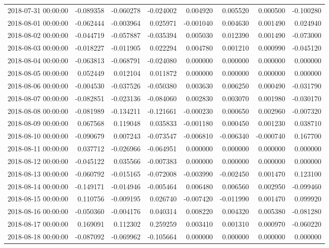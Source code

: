 \begin{tabular}{lrrrrrrr}
2018-07-31 00:00:00 & -0.089358 & -0.060278 & -0.024002 & 0.004920 & 0.005520 & 0.000500 & -0.100280 \\
2018-08-01 00:00:00 & -0.062444 & -0.003964 & 0.025971 & -0.001040 & 0.004630 & 0.001490 & 0.024940 \\
2018-08-02 00:00:00 & -0.044719 & -0.057887 & -0.035394 & 0.005030 & 0.012390 & 0.001490 & -0.073000 \\
2018-08-03 00:00:00 & -0.018227 & -0.011905 & 0.022294 & 0.004780 & 0.001210 & 0.000990 & -0.045120 \\
2018-08-04 00:00:00 & -0.063813 & -0.068791 & -0.024080 & 0.000000 & 0.000000 & 0.000000 & 0.000000 \\
2018-08-05 00:00:00 & 0.052449 & 0.012104 & 0.011872 & 0.000000 & 0.000000 & 0.000000 & 0.000000 \\
2018-08-06 00:00:00 & -0.004530 & -0.037526 & -0.050380 & 0.003630 & 0.006250 & 0.000490 & -0.031790 \\
2018-08-07 00:00:00 & -0.082851 & -0.023136 & -0.084060 & 0.002830 & 0.003070 & 0.001980 & -0.030170 \\
2018-08-08 00:00:00 & -0.081989 & -0.134211 & -0.121661 & -0.000230 & 0.000650 & 0.002960 & -0.007320 \\
2018-08-09 00:00:00 & 0.067568 & 0.119048 & 0.035833 & -0.001180 & 0.000450 & 0.001230 & 0.038710 \\
2018-08-10 00:00:00 & -0.090679 & 0.007243 & -0.073547 & -0.006810 & -0.006340 & -0.000740 & 0.167700 \\
2018-08-11 00:00:00 & 0.037712 & -0.026966 & -0.064951 & 0.000000 & 0.000000 & 0.000000 & 0.000000 \\
2018-08-12 00:00:00 & -0.045122 & 0.035566 & -0.007383 & 0.000000 & 0.000000 & 0.000000 & 0.000000 \\
2018-08-13 00:00:00 & -0.060792 & -0.015165 & -0.072008 & -0.003990 & -0.002450 & 0.001470 & 0.123100 \\
2018-08-14 00:00:00 & -0.149171 & -0.014946 & -0.005464 & 0.006480 & 0.006560 & 0.002950 & -0.099460 \\
2018-08-15 00:00:00 & 0.110756 & -0.009195 & 0.026740 & -0.007420 & -0.011990 & 0.001470 & 0.099920 \\
2018-08-16 00:00:00 & -0.050360 & -0.004176 & 0.040314 & 0.008220 & 0.004320 & 0.005380 & -0.081280 \\
2018-08-17 00:00:00 & 0.169091 & 0.112302 & 0.259259 & 0.003410 & 0.001310 & 0.000970 & -0.060220 \\
2018-08-18 00:00:00 & -0.087092 & -0.069962 & -0.105664 & 0.000000 & 0.000000 & 0.000000 & 0.000000 \\

\end{tabular}
